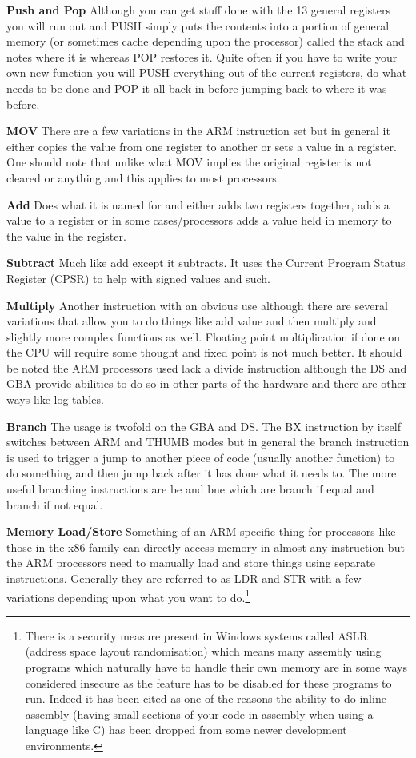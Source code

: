\documentclass[
]{book}
\begin{document}
\textbf{Push and Pop} Although you can get stuff done with the 13 general registers you will run out and PUSH simply puts the contents into a portion of general memory (or sometimes cache depending upon the processor) called the stack and notes where it is whereas POP restores it. Quite often if you have to write your own new function you will PUSH everything out of the current registers, do what needs to be done and POP it all back in before jumping back to where it was before.

\textbf{MOV} There are a few variations in the ARM instruction set but in general it either copies the value from one register to another or sets a value in a register. One should note that unlike what MOV implies the original register is not cleared or anything and this applies to most processors.

\textbf{Add} Does what it is named for and either adds two registers together, adds a value to a register or in some cases/processors adds a value held in memory to the value in the register.

\textbf{Subtract} Much like add except it subtracts. It uses the Current Program Status Register (CPSR) to help with signed values and such.

\textbf{Multiply} Another instruction with an obvious use although there are several variations that allow you to do things like add value and then multiply and slightly more complex functions as well. Floating point multiplication if done on the CPU will require some thought and fixed point is not much better. It should be noted the ARM processors used lack a divide instruction although the DS and GBA provide abilities to do so in other parts of the hardware and there are other ways like log tables.

\textbf{Branch} The usage is twofold on the GBA and DS. The BX instruction by itself switches between ARM and THUMB modes but in general the branch instruction is used to trigger a jump to another piece of code (usually another function) to do something and then jump back after it has done what it needs to. The more useful branching instructions are be and bne which are branch if equal and branch if not equal.

\textbf{Memory Load/Store} Something of an ARM specific thing for processors like those in the x86 family can directly access memory in almost any instruction but the ARM processors need to manually load and store things using separate instructions. Generally they are referred to as LDR and STR with a few variations depending upon what you want to do.\footnote{There is a security measure present in Windows systems called ASLR (address space layout randomisation) which means many assembly using programs which naturally have to handle their own memory are in some ways considered insecure as the feature has to be disabled for these programs to run. Indeed it has been cited as one of the reasons the ability to do inline assembly (having small sections of your code in assembly when using a language like C) has been dropped from some newer development environments.}
\end{document}
